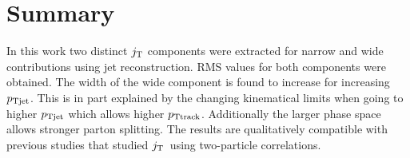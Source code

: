 \section{Summary}
\label{sec:summary}
In this work two distinct $j_{\rm T}$ components were extracted for narrow and wide contributions using jet reconstruction. RMS values for both components were obtained. The width of the wide component is found to increase for increasing $p_{\rm Tjet}$. This is in part explained by the changing kinematical limits when going to higher $p_{\rm Tjet}$ which allows higher $p_{\rm Ttrack}$. Additionally the larger phase space allows stronger parton splitting. The results are qualitatively compatible with previous studies that studied $j_{\rm T}$ using two-particle correlations.

